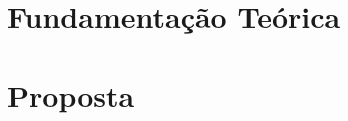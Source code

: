 \documentclass[
	12pt,																				%
	openright,																	%
	oneside,																		%
	a4paper,																		%
	chapter=TITLE,															%
	section=TITLE,															%
	english,																		%
	brazil,																			%
]{abntex2}
\begin{document}

\frenchspacing

\pretextual%


\textual%

\pagestyle{PagNumReduzida}										%


\chapter{Fundamentação Teórica}\label{ch:fundamentacao-teorica}



\chapter{Proposta}\label{ch:proposta}



\postextual%


\end{document}
